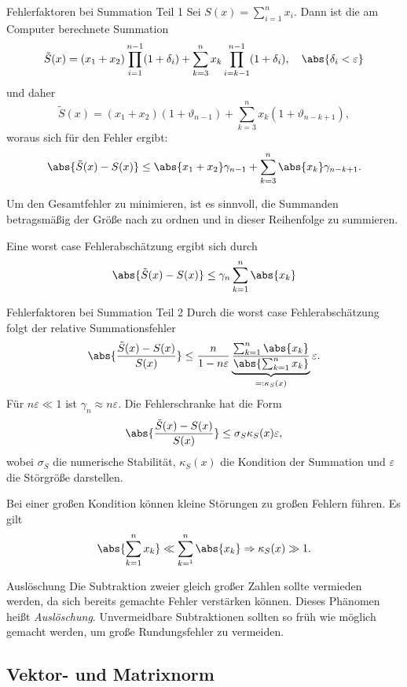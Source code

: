 \begin{karte}{Fehlerfaktoren bei Summation Teil 1}
    Sei \( S(x) = \sum_{i=1}^n x_i \). Dann ist die am Computer berechnete Summation 
    \[ \tilde{S}(x) = (x_1 + x_2) \prod_{i=1}^{n-1} (1+\delta_i) + \sum_{k=3}^n x_k \prod_{i=k-1}^{n-1} (1+\delta_i), \quad \abs{\delta_i < \varepsilon} \]
    und daher 
    \[ \tilde{S}(x) = (x_1 + x_2)(1 + \vartheta_{n-1}) + \sum_{k=3}^n x_k(1 + \vartheta_{n-k+1}), \]
    woraus sich für den Fehler ergibt:
    \[ \abs{ \tilde{S}(x) - S(x) } \leq \abs{x_1 + x_2}\gamma_{n-1} + \sum_{k=3}^n \abs{x_k}\gamma_{n-k+1}. \]

    Um den Gesamtfehler zu minimieren, ist es sinnvoll, die Summanden betragsmäßig der Größe 
    nach zu ordnen und in dieser Reihenfolge zu summieren.
    
    Eine worst case Fehlerabschätzung ergibt sich durch 
    \[ \abs{ \tilde{S}(x) - S(x) } \leq \gamma_n \sum_{k=1}^n \abs{x_k} \]
\end{karte}

\begin{karte}{Fehlerfaktoren bei Summation Teil 2}
    Durch die worst case Fehlerabschätzung folgt der relative Summationsfehler 
    \[ \abs{ \frac{ \tilde{S}(x) - S(x) }{ S(x) } } \leq \frac{n}{1 - n\varepsilon} \underbrace{ \frac{ \sum_{k=1}^n \abs{x_k} }{ \abs{ \sum_{k=1}^n x_k } } }_{=: \kappa_S(x)} \varepsilon. \]
    Für \( n\varepsilon \ll 1 \) ist \( \gamma_n \approx n\varepsilon \). 
    Die Fehlerschranke hat die Form 
    \[ \abs{ \frac{ \tilde{S}(x) - S(x) }{ S(x) } } \leq \sigma_S \kappa_S(x) \varepsilon, \]
    wobei \( \sigma_S \) die numerische Stabilität, \( \kappa_S(x) \) die Kondition 
    der Summation und \( \varepsilon \) die Störgröße darstellen.

    Bei einer großen Kondition können kleine Störungen zu großen Fehlern führen. 
    Es gilt 
    \[ \abs{ \sum_{k=1}^n x_k } \ll \sum_{k=^1}^n \abs{x_k} \Rightarrow \kappa_S(x) \gg 1. \]
\end{karte}

\begin{karte}{Auslöschung}
    Die Subtraktion zweier gleich großer Zahlen sollte vermieden werden, 
    da sich bereits gemachte Fehler verstärken können. Dieses Phänomen heißt \textit{Auslöschung}.
    Unvermeidbare Subtraktionen sollten so früh wie möglich gemacht werden, um große Rundungsfehler 
    zu vermeiden.
\end{karte}

\subsection*{Vektor- und Matrixnorm}

